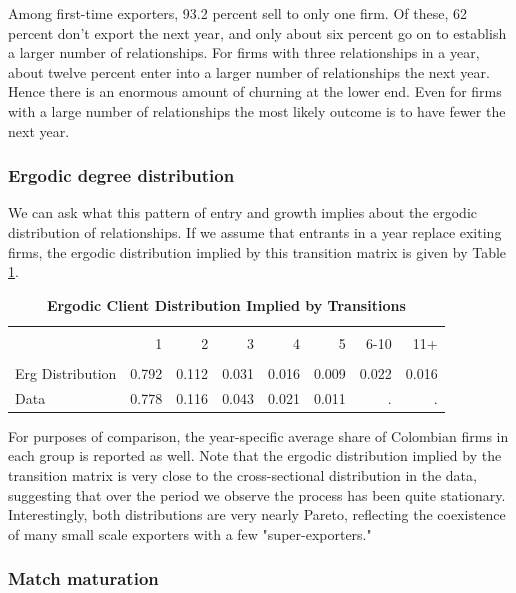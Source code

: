 \documentclass[12pt]{article}
\begin{document}
Among first-time exporters, 93.2 percent sell to only one firm. Of these, 62
percent don't export the next year, and only about six percent go on to
establish a larger number of relationships. For firms with three
relationships in a year, about twelve percent enter into a larger number of
relationships the next year. Hence there is an enormous amount of churning
at the lower end. Even for firms with a large number of relationships the
most likely outcome is to have fewer the next year.

\subsubsection{Ergodic degree distribution}

We can ask what this pattern of entry and growth implies about the ergodic
distribution of relationships. If we assume that entrants in a year replace
exiting firms, the ergodic distribution implied by this transition matrix is
given by Table \ref{tab:erg_cli_dist}.

\begin{table}[bph]
\caption{\textbf{Ergodic Client Distribution Implied by Transitions}}
\label{tab:erg_cli_dist}\centering{\small \ } \centering
\begin{tabular}{l|rrrrrrr}
\hline\hline
&  &  &  &  &  &  &  \\[1px] 
& 1 & 2 & 3 & 4 & 5 & 6-10 & 11+ \\ \hline
&  &  &  &  &  &  &  \\[1px] 
Erg Distribution & 0.792 & 0.112 & 0.031 & 0.016 & 0.009 & 0.022 & 0.016 \\ 
Data & 0.778 & 0.116 & 0.043 & 0.021 & 0.011 & . & . \\ \hline
\end{tabular}
\end{table}

For purposes of comparison, the year-specific average share of Colombian
firms in each group is reported as well. Note that the ergodic distribution
implied by the transition matrix is very close to the cross-sectional
distribution in the data, suggesting that over the period we observe the
process has been quite stationary. Interestingly, both distributions are
very nearly Pareto, reflecting the coexistence of many small scale exporters
with a few "super-exporters."

\subsubsection{Match maturation}
\end{document}
